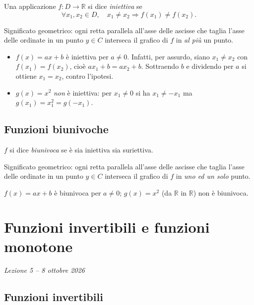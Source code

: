 \documentclass[11pt,a4paper]{article}
\begin{document}
\begin{definizione}
Una applicazione $f : D \to \mathbb{R}$ si dice \emph{iniettiva} se
\[
\forall x_1, x_2 \in D, \quad x_1 \neq x_2 \Rightarrow f(x_1) \neq f(x_2).
\]
\end{definizione}

Significato geometrico: ogni retta parallela all'asse delle ascisse che taglia l'asse delle ordinate in un punto $y \in C$ interseca il grafico di $f$ in \emph{al più} un punto.

\begin{esempio}
\leavevmode
\begin{itemize}
    \item $f(x) = ax + b$ è iniettiva per $a \neq 0$. Infatti, per assurdo, siano $x_1 \neq x_2$ con $f(x_1) = f(x_2)$, cioè $a x_1 + b = a x_2 + b$. Sottraendo $b$ e dividendo per $a$ si ottiene $x_1 = x_2$, contro l'ipotesi.
    \item $g(x) = x^2$ \emph{non} è iniettiva: per $x_1 \neq 0$ si ha $x_1 \neq -x_1$ ma $g(x_1) = x_1^2 = g(-x_1)$.
\end{itemize}
\end{esempio}

\subsection{Funzioni biunivoche}

\begin{definizione}
$f$ si dice \emph{biunivoca} se è sia iniettiva sia suriettiva.
\end{definizione}

Significato geometrico: ogni retta parallela all'asse delle ascisse che taglia l'asse delle ordinate in un punto $y \in C$ interseca il grafico di $f$ in \emph{uno ed un solo} punto.

\begin{esempio}
$f(x) = ax + b$ è biunivoca per $a \neq 0$; $g(x) = x^2$ (da $\mathbb{R}$ in $\mathbb{R}$) non è biunivoca.
\end{esempio}

\section[Funzioni invertibili e funzioni monotone (Lezione 5 -- 8 ottobre 2026)]{Funzioni invertibili e funzioni monotone}
\noindent\emph{Lezione 5 -- 8 ottobre 2026}
\subsection{Funzioni invertibili}
\end{document}
